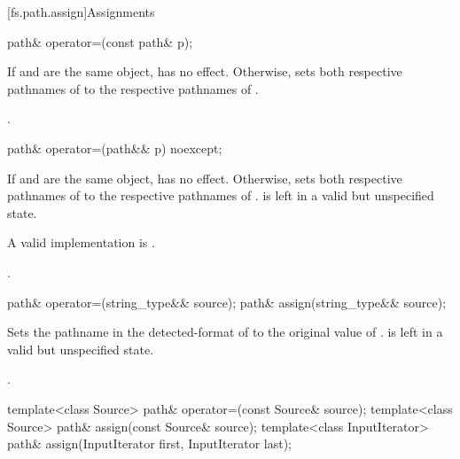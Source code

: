 [fs.path.assign]{Assignments}

%
\begin{itemdecl}
path& operator=(const path& p);
\end{itemdecl}

\begin{itemdescr}
\pnum
\effects If  and  are the same
object, has no effect.
Otherwise,
sets both respective pathnames of 
to the respective pathnames of .

\pnum
\returns {}.
\end{itemdescr}

%
\begin{itemdecl}
path& operator=(path&& p) noexcept;
\end{itemdecl}

\begin{itemdescr}
\pnum
\effects If  and  are the same
object, has no effect. Otherwise,
sets both respective pathnames of 
to the respective pathnames of .
 is left in a valid but unspecified state.
\begin{note} A valid implementation is . \end{note}

\pnum
\returns {}.
\end{itemdescr}

%
%
\begin{itemdecl}
path& operator=(string_type&& source);
path& assign(string_type&& source);
\end{itemdecl}

\begin{itemdescr}
\pnum
\effects Sets the pathname in the detected-format of 
to the original value of .
 is left in a valid but unspecified state.

\pnum
\returns {}.
\end{itemdescr}

%
%
\begin{itemdecl}
template<class Source>
  path& operator=(const Source& source);
template<class Source>
  path& assign(const Source& source);
template<class InputIterator>
  path& assign(InputIterator first, InputIterator last);
\end{itemdecl}

